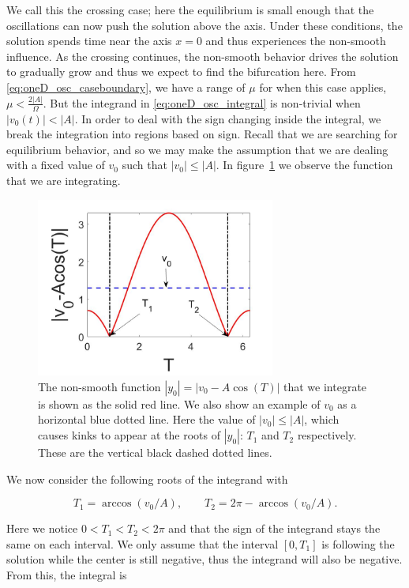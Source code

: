 We call this the crossing case; here the equilibrium is small enough that the oscillations can now push the solution above the axis. Under these conditions, the solution spends time near the axis $x=0$ and thus experiences the non-smooth influence. As the crossing continues, the non-smooth behavior drives the solution to gradually grow and thus we expect to find the bifurcation here. From \eqref{eq:oneD_osc_caseboundary}, we have a range of $\mu$ for when this case applies, $\mu<\frac{2|A|}{\Omega}$. But the integrand in \eqref{eq:oneD_osc_integral} is non-trivial when $|v_0(t)|<|A|$. In order to deal with the sign changing inside the integral, we break the integration into regions based on sign. Recall that we are searching for equilibrium behavior, and so we may make the assumption that we are dealing with a fixed value of $v_0$ such that $|v_0|\le |A|$. In figure~\ref{fig:oneD_osc_t1t2_graphic} we observe the function that we are integrating.

\begin{figure}[H]
\centering
\includegraphics[width=0.7\textwidth]{oneD/t1t2_graphic.jpg}
\caption{The non-smooth function $|y_0|=|v_0-A\cos(T)|$ that we integrate is shown as the solid red line. We also show an example of $v_0$ as a horizontal blue dotted line. Here the value of $|v_0|\le|A|$, which causes kinks to appear at the roots of $|y_0|$: $T_1$ and $T_2$ respectively. These are the vertical black dashed dotted lines. }
\label{fig:oneD_osc_t1t2_graphic}
\end{figure}

We now consider the following roots of the integrand with 

\begin{equation*}
T_1=\arccos (v_0/A),\qquad T_2= 2\pi - \arccos (v_0/A).
\end{equation*}

Here we notice $0<T_1<T_2<2\pi$ and that the sign of the integrand stays the same on each interval. We only assume that the interval $[0,T_1]$ is following the solution while the center is still negative, thus the integrand will also be negative. From this, the integral is

